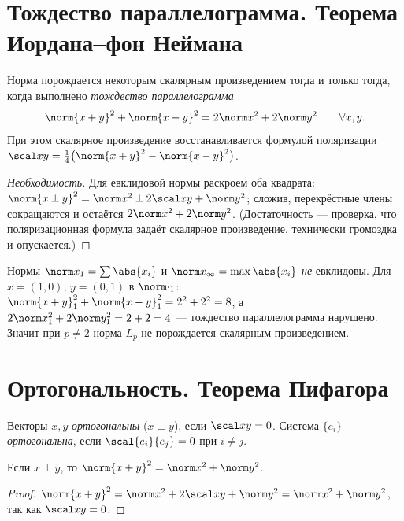 \section{Тождество параллелограмма. Теорема Иордана–фон Неймана}

\begin{theorem}
Норма порождается некоторым скалярным произведением тогда и только тогда, когда выполнено
\emph{тождество параллелограмма}
\[
  \norm{x+y}^2+\norm{x-y}^2=2\norm x^2+2\norm y^2\qquad\forall x,y .
\]
При этом скалярное произведение восстанавливается формулой поляризации
$\scal xy=\tfrac14\bigl(\norm{x+y}^2-\norm{x-y}^2\bigr)$.
\end{theorem}

\begin{proof}[Необходимость]
Для евклидовой нормы раскроем оба квадрата:
$\norm{x\pm y}^2=\norm x^2\pm2\scal xy+\norm y^2$; сложив, перекрёстные члены сокращаются и остаётся
$2\norm x^2+2\norm y^2$. (Достаточность — проверка, что поляризационная формула задаёт скалярное
произведение, технически громоздка и опускается.)
\end{proof}

\begin{example}
Нормы $\norm x_1=\sum\abs{x_i}$ и $\norm x_\infty=\max\abs{x_i}$ \emph{не} евклидовы. Для
$x=(1,0)$, $y=(0,1)$ в $\norm\cdot_1$: $\norm{x+y}_1^2+\norm{x-y}_1^2=2^2+2^2=8$, а
$2\norm x_1^2+2\norm y_1^2=2+2=4$ — тождество параллелограмма нарушено. Значит при $p\ne2$ норма
$L_p$ не порождается скалярным произведением.
\end{example}

\section{Ортогональность. Теорема Пифагора}

\begin{definition}
Векторы $x,y$ \emph{ортогональны} ($x\perp y$), если $\scal xy=0$. Система $\{e_i\}$
\emph{ортогональна}, если $\scal{e_i}{e_j}=0$ при $i\ne j$.
\end{definition}

\begin{theorem}[Пифагор]
Если $x\perp y$, то $\norm{x+y}^2=\norm x^2+\norm y^2$.
\end{theorem}

\begin{proof}
$\norm{x+y}^2=\norm x^2+2\scal xy+\norm y^2=\norm x^2+\norm y^2$, так как $\scal xy=0$.
\end{proof}

